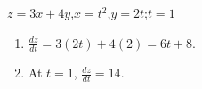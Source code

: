 {$z=3x+4y$,\qquad $x=t^2$,\qquad $y=2t$;\qquad $t=1$\label{12_08_ex_07}}
{\begin{enumerate}
	\item $\frac{dz}{dt} = 3(2t)+4(2) = 6t+8$.
	\item At $t=1$, $\frac{dz}{dt} = 14$.
\end{enumerate}}
